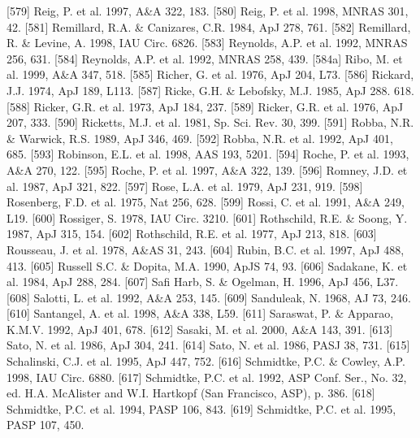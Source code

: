 \documentclass{aa}
\begin{document}
\begin{thebibliography}{}
\bibitem[]{}[579] Reig, P. et al. 1997, A\&A 322, 183.
\bibitem[]{}[580] Reig, P. et al. 1998, MNRAS 301, 42.
\bibitem[]{}[581] Remillard, R.A. \& Canizares, C.R. 1984, ApJ 278, 761.
\bibitem[]{}[582] Remillard, R. \& Levine, A. 1998, IAU Circ. 6826.
\bibitem[]{}[583] Reynolds, A.P. et al. 1992, MNRAS 256, 631.
\bibitem[]{}[584] Reynolds, A.P. et al. 1992, MNRAS 258, 439.
\bibitem[]{}[584a] Ribo, M. et al. 1999, A\&A 347, 518.
\bibitem[]{}[585] Richer, G. et al. 1976, ApJ 204, L73.
\bibitem[]{}[586] Rickard, J.J. 1974, ApJ 189, L113.
\bibitem[]{}[587] Ricke, G.H. \& Lebofsky, M.J. 1985, ApJ 288. 618.
\bibitem[]{}[588] Ricker, G.R. et al. 1973, ApJ 184, 237.
\bibitem[]{}[589] Ricker, G.R. et al. 1976, ApJ 207, 333.
\bibitem[]{}[590] Ricketts, M.J. et al. 1981, Sp. Sci. Rev. 30, 399.
\bibitem[]{}[591] Robba, N.R. \& Warwick, R.S. 1989, ApJ 346, 469.
\bibitem[]{}[592] Robba, N.R. et al. 1992, ApJ 401, 685.
\bibitem[]{}[593] Robinson, E.L. et al. 1998, AAS 193, 5201.
\bibitem[]{}[594] Roche, P. et al. 1993, A\&A 270, 122.
\bibitem[]{}[595] Roche, P. et al. 1997, A\&A 322, 139.
\bibitem[]{}[596] Romney, J.D. et al. 1987, ApJ 321, 822.
\bibitem[]{}[597] Rose, L.A. et al. 1979, ApJ 231, 919.
\bibitem[]{}[598] Rosenberg, F.D. et al. 1975, Nat 256, 628.
\bibitem[]{}[599] Rossi, C. et al. 1991, A\&A 249, L19.
\bibitem[]{}[600] Rossiger, S. 1978, IAU Circ. 3210.
\bibitem[]{}[601] Rothschild, R.E. \& Soong, Y. 1987, ApJ 315, 154.
\bibitem[]{}[602] Rothschild, R.E. et al. 1977, ApJ 213, 818.
\bibitem[]{}[603] Rousseau, J. et al. 1978, A\&AS 31, 243.
\bibitem[]{}[604] Rubin, B.C. et al. 1997, ApJ 488, 413.
\bibitem[]{}[605] Russell S.C. \& Dopita, M.A. 1990, ApJS 74, 93.
\bibitem[]{}[606] Sadakane, K. et al. 1984, ApJ 288, 284.
\bibitem[]{}[607] Safi Harb, S. \& Ogelman, H. 1996, ApJ 456, L37.
\bibitem[]{}[608] Salotti, L. et al. 1992, A\&A 253, 145.
\bibitem[]{}[609] Sanduleak, N. 1968, AJ 73, 246.
\bibitem[]{}[610] Santangel, A. et al. 1998, A\&A 338, L59.
\bibitem[]{}[611] Saraswat, P. \& Apparao, K.M.V. 1992, ApJ 401, 678.
\bibitem[]{}[612] Sasaki, M. et al. 2000, A\&A 143, 391.                             
\bibitem[]{}[613] Sato, N. et al. 1986, ApJ 304, 241.
\bibitem[]{}[614] Sato, N. et al. 1986, PASJ 38, 731.
\bibitem[]{}[615] Schalinski, C.J. et al. 1995, ApJ 447, 752.
\bibitem[]{}[616] Schmidtke, P.C. \& Cowley, A.P. 1998,  IAU Circ. 6880.
\bibitem[]{}[617] Schmidtke, P.C. et al. 1992, ASP Conf. Ser., No. 32, ed. H.A. McAlister and W.I. 
               Hartkopf (San Francisco, ASP), p. 386. 
\bibitem[]{}[618] Schmidtke, P.C. et al. 1994, PASP 106, 843.
\bibitem[]{}[619] Schmidtke, P.C. et al. 1995, PASP 107, 450.

\end{thebibliography}
\end{document}
